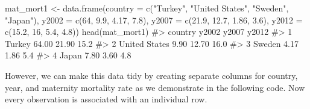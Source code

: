 \documentclass[
  letterpaper,
]{latex/krantz}
\makeatletter
\newenvironment{Shaded}{\begin{snugshade}}{\end{snugshade}}
\newcommand{\AttributeTok}[1]{\textcolor[rgb]{0.40,0.45,0.13}{#1}}
\newcommand{\CommentTok}[1]{\textcolor[rgb]{0.37,0.37,0.37}{#1}}
\newcommand{\DecValTok}[1]{\textcolor[rgb]{0.68,0.00,0.00}{#1}}
\newcommand{\FloatTok}[1]{\textcolor[rgb]{0.68,0.00,0.00}{#1}}
\newcommand{\FunctionTok}[1]{\textcolor[rgb]{0.28,0.35,0.67}{#1}}
\newcommand{\NormalTok}[1]{\textcolor[rgb]{0.00,0.23,0.31}{#1}}
\newcommand{\OtherTok}[1]{\textcolor[rgb]{0.00,0.23,0.31}{#1}}
\newcommand{\StringTok}[1]{\textcolor[rgb]{0.13,0.47,0.30}{#1}}
\newenvironment{kframe}{%
\medskip{}
\setlength{\fboxsep}{.8em}
 \def\at@end@of@kframe{}%
 \ifinner\ifhmode%
  \def\at@end@of@kframe{\end{minipage}}%
  \begin{minipage}{\columnwidth}%
 \fi\fi%
 \def\FrameCommand##1{\hskip\@totalleftmargin \hskip-\fboxsep
 \colorbox{shadecolor}{##1}\hskip-\fboxsep
     \hskip-\linewidth \hskip-\@totalleftmargin \hskip\columnwidth}%
 \MakeFramed {\advance\hsize-\width
   \@totalleftmargin\z@ \linewidth\hsize
   \@setminipage}}%
 {\par\unskip\endMakeFramed%
 \at@end@of@kframe}
\renewenvironment{Shaded}{\begin{kframe}}{\end{kframe}}
\makeatother
\begin{document}
\begin{Shaded}
\begin{Highlighting}[]
\NormalTok{mat\_mort1 }\OtherTok{\textless{}{-}} \FunctionTok{data.frame}\NormalTok{(}\AttributeTok{country =} \FunctionTok{c}\NormalTok{(}\StringTok{"Turkey"}\NormalTok{, }\StringTok{"United States"}\NormalTok{, }
                                    \StringTok{"Sweden"}\NormalTok{, }\StringTok{"Japan"}\NormalTok{),}
                       \AttributeTok{y2002 =} \FunctionTok{c}\NormalTok{(}\DecValTok{64}\NormalTok{, }\FloatTok{9.9}\NormalTok{, }\FloatTok{4.17}\NormalTok{, }\FloatTok{7.8}\NormalTok{),}
                       \AttributeTok{y2007 =} \FunctionTok{c}\NormalTok{(}\FloatTok{21.9}\NormalTok{, }\FloatTok{12.7}\NormalTok{, }\FloatTok{1.86}\NormalTok{, }\FloatTok{3.6}\NormalTok{),}
                       \AttributeTok{y2012 =} \FunctionTok{c}\NormalTok{(}\FloatTok{15.2}\NormalTok{, }\DecValTok{16}\NormalTok{, }\FloatTok{5.4}\NormalTok{, }\FloatTok{4.8}\NormalTok{))}
\FunctionTok{head}\NormalTok{(mat\_mort1)}
\CommentTok{\#\textgreater{}         country y2002 y2007 y2012}
\CommentTok{\#\textgreater{} 1        Turkey 64.00 21.90  15.2}
\CommentTok{\#\textgreater{} 2 United States  9.90 12.70  16.0}
\CommentTok{\#\textgreater{} 3        Sweden  4.17  1.86   5.4}
\CommentTok{\#\textgreater{} 4         Japan  7.80  3.60   4.8}
\end{Highlighting}
\end{Shaded}

However, we can make this data tidy by creating separate columns for
country, year, and maternity mortality rate as we demonstrate in the
following code. Now every observation is associated with an individual
row.
\end{document}
